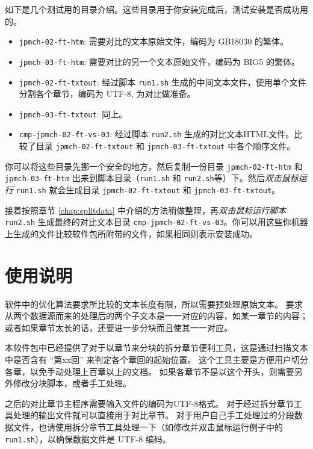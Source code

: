 \documentclass{article}
\begin{document}
如下是几个测试用的目录介绍。这些目录用于你安装完成后，测试安装是否成功用的。
\begin{itemize}
  \item \texttt{jpmch-02-ft-htm}: 需要对比的文本原始文件，编码为 GB18030 的繁体。
  \item \texttt{jpmch-03-ft-htm}: 需要对比的另一个文本原始文件，编码为 BIG5 的繁体。
  \item \texttt{jpmch-02-ft-txtout}: 经过脚本 \texttt{run1.sh} 生成的中间文本文件，使用单个文件分割各个章节，编码为 UTF-8, 为对比做准备。
  \item \texttt{jpmch-03-ft-txtout}: 同上。
  \item \texttt{cmp-jpmch-02-ft-vs-03}: 经过脚本 \texttt{run2.sh} 生成的对比文本HTML文件。比较了目录 \texttt{jpmch-02-ft-txtout} 和 \texttt{jpmch-03-ft-txtout} 中各个顺序文件。
\end{itemize}

你可以将这些目录先挪一个安全的地方，然后复制一份目录 \texttt{jpmch-02-ft-htm} 和 \texttt{jpmch-03-ft-htm}
出来到脚本目录（\texttt{run1.sh} 和 \texttt{run2.sh}等）下。然后\emph{双击鼠标运行} \texttt{run1.sh} 就会生成目录 \texttt{jpmch-02-ft-txtout} 和 \texttt{jpmch-03-ft-txtout}。

接着按照章节 \ref{chap:splitdata} 中介绍的方法稍做整理，再\emph{双击鼠标运行脚本} \texttt{run2.sh} 生成最终的对比文本目录  \texttt{cmp-jpmch-02-ft-vs-03}。你可以用这些你机器上生成的文件比较软件包所附带的文件，如果相同则表示安装成功。



\section{使用说明}

软件中的优化算法要求所比较的文本长度有限，所以需要预处理原始文本。
要求从两个数据源而来的处理后的两个子文本是一一对应的内容，如某一章节的内容；或者如果章节太长的话，还要进一步分块而且使其一一对应。

本软件包中已经提供了对于以章节来分块的拆分章节便利工具，这是通过扫描文本中是否含有 ``第xx回'' 来判定各个章回的起始位置。
这个工具主要是方便用户切分各章，以免手动处理上百章以上的文档。
如果各章节不是以这个开头，则需要另外修改分块脚本，或者手工处理。


之后的对比章节主程序需要输入文件的编码为UTF-8格式。
对于经过拆分章节工具处理的输出文件就可以直接用于对比章节。
对于用户自己手工处理过的分段数据文件，也请使用拆分章节工具处理一下（如修改并双击鼠标运行例子中的\texttt{run1.sh}），以确保数据文件是 UTF-8 编码。
\end{document}
